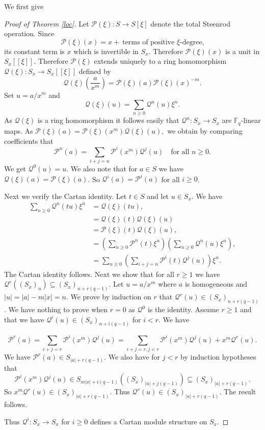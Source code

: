 \documentclass{amsart}
\newcommand{\F}{\mathbb{F} }
\newcommand{\Pc}{\mathcal{P} }
\newcommand{\Qc}{\mathcal{Q} }
\newcommand{\rt}{\rightarrow}
\theoremstyle{plain}
\theoremstyle{definition}
\theoremstyle{remark}
\begin{document}
We first give
\begin{proof}[Proof of Theorem \ref{loc}]
Let $\Pc(\xi)\colon S \rt S[\xi]$ denote  the total Steenrod operation. Since
$$\Pc(\xi)(x) = x + \ \text{terms of positive $\xi$-degree,}$$
its constant term is $x$ which is invertible in $S_x$. Therefore $\Pc(\xi)(x)$ is a unit in $S_x[[\xi]]$. Therefore $\Pc(\xi)$  extends uniquely to a ring homomorphism $\Qc(\xi) \colon S_x \rt S_x[[ \xi]]$ defined by
$$ \Qc(\xi)(\frac{a}{x^m}) = \Pc(\xi)(a)\Pc(\xi)(x)^{-m}.$$
Set $u = a/x^m$ and
$$ \Qc(\xi)(u) = \sum_{n \geq 0}\Qc^n(u)\xi^n.$$
As $\Qc(\xi)$ is a ring homomorphism it follows easily that $\Qc^n \colon S_x \rt S_x$ are $\F_q$-linear maps.
As $\Pc(\xi)(a) = \Pc(\xi)(x^m)\Qc(\xi)(u),$ we obtain by comparing coefficients that
$$ \Pc^n(a) = \sum_{i+j = n}\Pc^i(x^m)\Qc^j(u) \quad \text{for all $n\geq 0$}.$$
We get $\Qc^0(u) = u$. We also note that for $a \in S$ we have $\Qc(\xi)(a) = \Pc(\xi)(a)$. So $\Qc^i(a) = \Pc^i(a)$ for all $i \geq 0$.

Next we verify the Cartan identity. Let $t\in S$  and let $u \in S_x$. We have
\begin{align*}
  \sum_{n \geq 0}\Qc^n(tu)\xi^n &= \Qc(\xi)(tu), \\
  &= \Qc(\xi)(t)\Qc(\xi)(u) \\
   &= \Pc(\xi)(t) \Qc(\xi)(u), \\
  &= \left(\sum_{n \geq 0}\Pc^n(t)\xi^n \right)\left( \sum_{n \geq 0}\Qc^n(u)\xi^n \right), \\
  &= \sum_{n \geq 0}\left(\sum_{i+j = n}\Pc^i(t)\Qc^j(u) \right) \xi^n.
\end{align*}
The Cartan identity follows.
Next we show that for all $r \geq 1$ we have $\Qc^r((S_x)_n) \subseteq (S_x)_{n + r(q-1)}$.
Let $u = a/x^m$ where $a$ is homogeneous and $|u| = |a| - m|x| = n$. We prove by induction on $r$ that $\Qc^r(u) \in (S_x)_{n + r(q-1)}$. We have nothing to prove when $r = 0$ as $\Qc^0$ is the identity. Assume $r \geq 1$ and that we have $\Qc^i(u) \in (S_x)_{n + i(q-1)}$ for $i < r$.
We have

$$ \Pc^r(a) = \sum_{i+j = r}\Pc^i(x^m)\Qc^j(u)  = \sum_{i+j = r, j<r}\Pc^i(x^m)\Qc^j(u) + x^m\Qc^r(u). $$
We have $\Pc^r(a) \in S_{|a| + r(q-1)}$. We also have  for $j < r$ by induction hypotheses that $$\Pc^i(x^m)\Qc^j(u) \in S_{m|x| + i(q-1)}((S_x)_{|u| +j (q-1)}) \subseteq (S_x)_{|a| + r(q-1)}. $$
So
$x^m\Qc^r(u) \in
(S_x)_{|a| + r(q-1)}$. Thus $\Qc^r(u) \in (S_x)_{|u| + r(q-1)}$. The result follows.

 Thus $\Qc^i \colon S_x \rt S_x$ for $i \geq 0$ defines a Cartan module structure on $S_x$.


\end{proof}
\end{document}
